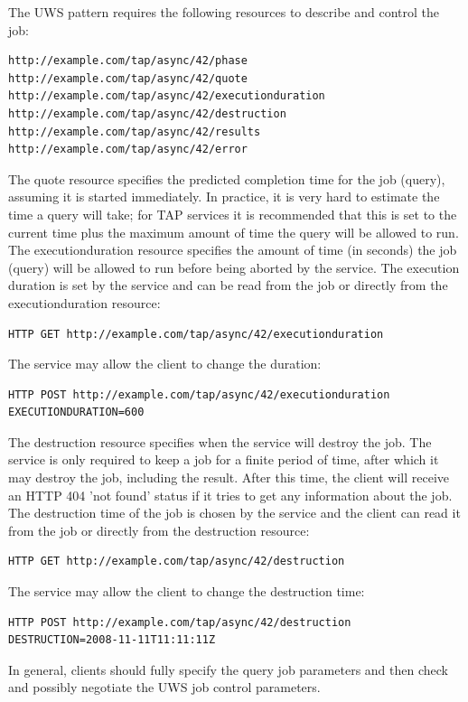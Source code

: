 \documentclass[11pt,letter]{ivoa}
\begin{document}
The UWS pattern requires the following resources to describe and control the 
job:
\begin{verbatim}
http://example.com/tap/async/42/phase
http://example.com/tap/async/42/quote
http://example.com/tap/async/42/executionduration
http://example.com/tap/async/42/destruction
http://example.com/tap/async/42/results
http://example.com/tap/async/42/error
\end{verbatim}
The quote resource specifies the predicted completion time for the job (query), 
assuming it is started immediately. In practice, it is very hard to estimate the 
time a query will take; for TAP services it is recommended that this is set to 
the current time plus the maximum amount of time the query will be allowed to 
run. The executionduration resource specifies the amount of time (in seconds) 
the job (query) will be allowed to run before being aborted by the service. The 
execution duration is set by the service and can be read from the job or 
directly from the executionduration resource:

\begin{verbatim}
HTTP GET http://example.com/tap/async/42/executionduration
\end{verbatim}
The service may allow the client to change the duration:
\begin{verbatim}
HTTP POST http://example.com/tap/async/42/executionduration
EXECUTIONDURATION=600
\end{verbatim}

The destruction resource specifies when the service will destroy the job. The 
service is only required to keep a job for a finite period of time, after which 
it may destroy the job, including the result. After this time, the client will 
receive an HTTP 404 'not found' status if it tries to get any information about 
the job. The destruction time of the job is chosen by the service and the client 
can read it from the job or directly from the destruction resource:
\begin{verbatim}
HTTP GET http://example.com/tap/async/42/destruction
\end{verbatim}
The service may allow the client to change the destruction time:
\begin{verbatim}
HTTP POST http://example.com/tap/async/42/destruction
DESTRUCTION=2008-11-11T11:11:11Z
\end{verbatim}

In general, clients should fully specify the query job parameters and then 
check and possibly negotiate the UWS job control parameters.
\end{document}
